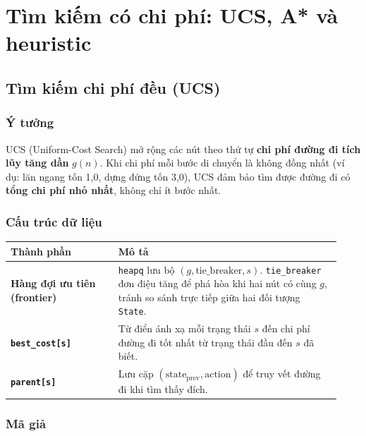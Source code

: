 \section{Tìm kiếm có chi phí: UCS, A* và heuristic}

\subsection{Tìm kiếm chi phí đều (UCS)}

\subsubsection{Ý tưởng}

UCS (Uniform-Cost Search) mở rộng các nút theo thứ tự \textbf{chi phí đường đi tích lũy tăng dần} $g(n)$. Khi chi phí mỗi bước di chuyển là không đồng nhất (ví dụ: lăn ngang tốn 1,0, dựng đứng tốn 3,0), UCS đảm bảo tìm được đường đi có \textbf{tổng chi phí nhỏ nhất}, không chỉ ít bước nhất.

\subsubsection{Cấu trúc dữ liệu}

{\renewcommand{\arraystretch}{1.25}
\begin{longtable}{|>{\raggedright\arraybackslash}p{0.306\linewidth}|>{\raggedright\arraybackslash}p{0.624\linewidth}|}
\hline
\textbf{Thành phần} & \textbf{Mô tả} \\ \hline
\endhead
\hline
\endlastfoot
\textbf{Hàng đợi ưu tiên (frontier)} & \texttt{heapq} lưu bộ $(g, \text{tie\_breaker}, s)$. \texttt{tie\_\allowbreak{}breaker} đơn điệu tăng để phá hòa khi hai nút có cùng $g$, tránh so sánh trực tiếp giữa hai đối tượng \texttt{State}. \\ \hline
\textbf{\texttt{best\_\allowbreak{}cost[s]}} & Từ điển ánh xạ mỗi trạng thái $s$ đến chi phí đường đi tốt nhất từ trạng thái đầu đến $s$ đã biết. \\ \hline
\textbf{\texttt{parent[s]}} & Lưu cặp $(\text{state}_{\text{prev}}, \text{action})$ để truy vết đường đi khi tìm thấy đích. \\
\end{longtable}
}

\subsubsection{Mã giả}

